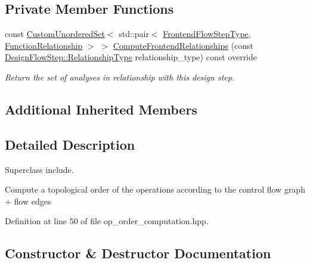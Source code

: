 \subsection*{Private Member Functions}
\begin{DoxyCompactItemize}
\item 
const \hyperlink{classCustomUnorderedSet}{Custom\+Unordered\+Set}$<$ std\+::pair$<$ \hyperlink{frontend__flow__step_8hpp_afeb3716c693d2b2e4ed3e6d04c3b63bb}{Frontend\+Flow\+Step\+Type}, \hyperlink{classFrontendFlowStep_af7cf30f2023e5b99e637dc2058289ab0}{Function\+Relationship} $>$ $>$ \hyperlink{classOpOrderComputation_ab2d87d9aeb8f52a0f96f421d1839fb5b}{Compute\+Frontend\+Relationships} (const \hyperlink{classDesignFlowStep_a723a3baf19ff2ceb77bc13e099d0b1b7}{Design\+Flow\+Step\+::\+Relationship\+Type} relationship\+\_\+type) const override
\begin{DoxyCompactList}\small\item\em Return the set of analyses in relationship with this design step. \end{DoxyCompactList}\end{DoxyCompactItemize}
\subsection*{Additional Inherited Members}


\subsection{Detailed Description}
Superclass include. 

Compute a topological order of the operations according to the control flow graph + flow edges 

Definition at line 50 of file op\+\_\+order\+\_\+computation.\+hpp.



\subsection{Constructor \& Destructor Documentation}
\mbox{\label{classOpOrderComputation_a5805bb8f1921664144270677bbcf9b5f}} 
